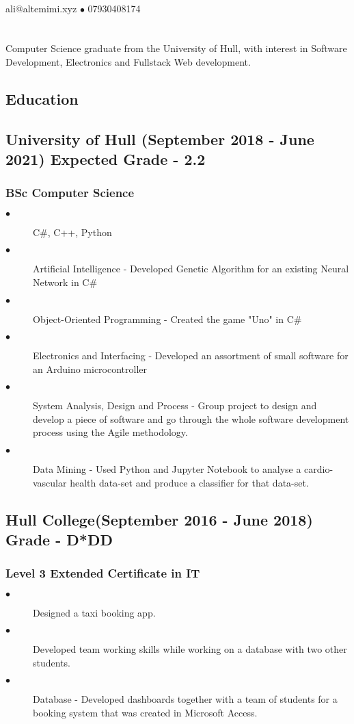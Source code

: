\documentclass{article}
\author{Ali Al Temimi}
\makeatletter
\renewcommand{\maketitle}{
\begin{center}
    {\huge\bfseries
    \theauthor}
    {\Large \\ali@altemimi.xyz $\bullet$ 07930408174}
    \vspace{-4em}
\end{center}
}
\makeatother
\begin{document}
    \maketitle
\section{}
Computer Science graduate from the University of Hull, with interest in Software Development, Electronics and Fullstack Web development. 
    \begin{multicols}{2}
        \section{Education}
        \subsection{University of Hull (September 2018 - June 2021) Expected Grade - 2.2}
        \subsubsection{BSc Computer Science}
        \begin{description}
            \item[$\bullet$]C\#, C++, Python
            \item[$\bullet$]Artificial Intelligence - Developed Genetic Algorithm for an existing Neural Network in C\#
            \item[$\bullet$]Object-Oriented Programming - Created the game "Uno" in C\# 
            \item[$\bullet$]Electronics and Interfacing - Developed an assortment of small software for an Arduino microcontroller
            \item[$\bullet$]System Analysis, Design and Process - Group project to design and develop a piece of software and go through the whole software development process using the Agile methodology. 
            \item[$\bullet$]Data Mining - Used Python and Jupyter Notebook to analyse a cardio-vascular health data-set and produce a classifier for that data-set. 
        \end{description}
        \subsection{Hull College(September 2016 - June 2018) Grade - D*DD}
        \subsubsection{Level 3 Extended Certificate in IT}
        \begin{description}
            \item[$\bullet$]Designed a taxi booking app.
            \item[$\bullet$]Developed team working skills while working on a database with two other students. 
            \item[$\bullet$]Database - Developed dashboards together with a team of students for a booking system that was created in Microsoft Access. 
        \end{description}

\end{multicols}
\end{document}
